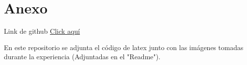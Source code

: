 \section{Anexo}\label{sec:Anexo}
Link de github
\href{https://github.com/Radswet/tecnologias_inalambricas/tree/main/lab4}{Click aquí}

En este repositorio se adjunta el código de latex junto con las imágenes tomadas durante la experiencia (Adjuntadas en el "Readme").